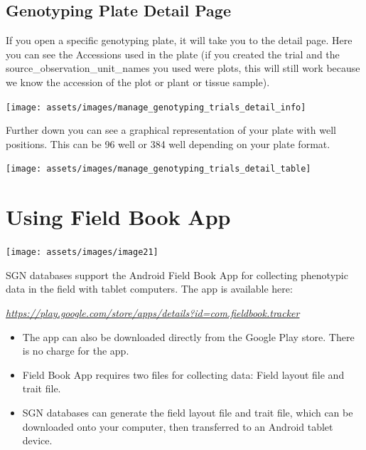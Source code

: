 \documentclass[
  12pt,
]{book}
\begin{document}
\hypertarget{genotyping-plate-detail-page}{%
\section{Genotyping Plate Detail Page}\label{genotyping-plate-detail-page}}

If you open a specific genotyping plate, it will take you to the detail page. Here you can see the Accessions used in the plate (if you created the trial and the source\_observation\_unit\_names you used were plots, this will still work because we know the accession of the plot or plant or tissue sample).

\begin{center}\texttt{[image: assets/images/manage\_genotyping\_trials\_detail\_info]} \end{center}

Further down you can see a graphical representation of your plate with well positions. This can be 96 well or 384 well depending on your plate format.

\begin{center}\texttt{[image: assets/images/manage\_genotyping\_trials\_detail\_table]} \end{center}

\hypertarget{using-fieldbook-app}{%
\chapter{Using Field Book App}\label{using-fieldbook-app}}

\begin{center}\texttt{[image: assets/images/image21]} \end{center}

SGN databases support the Android Field Book App for collecting phenotypic data in the field with tablet computers. The app is available here:

\href{https://play.google.com/store/apps/details?id=com.fieldbook.tracker}{\emph{https://play.google.com/store/apps/details?id=com.fieldbook.tracker}}

\begin{itemize}
\item
  The app can also be downloaded directly from the Google Play store. There is no charge for the app.
\item
  Field Book App requires two files for collecting data: Field layout file and trait file.
\item
  SGN databases can generate the field layout file and trait file, which can be downloaded onto your computer, then transferred to an Android tablet device.
\end{itemize}
\end{document}
